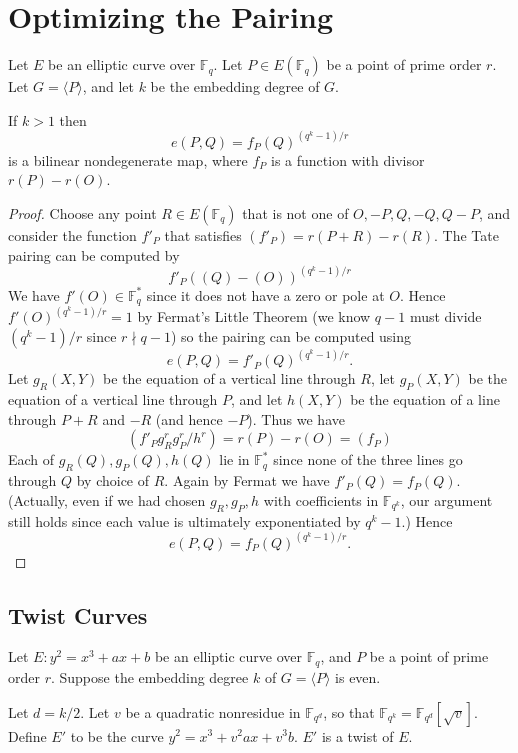\chapter{Optimizing the Pairing}

\begin{theorem}
Let $E$ be an elliptic curve over $\mathbb{F}_q$.
Let $P \in E(\mathbb{F}_q)$ be a point of prime order $r$.
Let $G = \langle P \rangle$, and let $k$ be the embedding degree of $G$.

If $k > 1$ then
\[
e(P,Q) = f_P(Q)^{(q^k-1)/r}
\]
is a bilinear nondegenerate map,
where $f_P$ is a function with divisor $r(P) - r(O)$.
\end{theorem}

\begin{proof}
Choose any point $R \in E(\mathbb{F}_q)$ that is not one of
$O, -P, Q, -Q, Q - P$,
and consider the function $f'_P$ that satisfies $(f'_P) = r(P+R) - r(R)$.
The Tate pairing can be computed by
\[
f'_P((Q)-(O))^{(q^k-1)/r}
\]
We have $f'(O) \in \mathbb{F}_q^*$ since it does not have a zero or pole
at $O$. Hence
$f'(O)^{(q^k-1)/r} = 1$ by Fermat's Little Theorem (we know $q-1$ must
divide $(q^k - 1)/r$ since $r\nmid q-1$) so the pairing can be computed using
\[ e(P,Q) = f'_P(Q)^{(q^k-1)/r} . \]
Let $g_R(X,Y)$ be the equation of a vertical line through $R$,
let $g_P(X,Y)$ be the equation of a vertical line through $P$,
and let $h(X,Y)$ be the equation of a line through $P+R$ and $-R$ (and hence
$-P$).
Thus we have
\[ (f'_P g_R^r g_P^r / h^r) = r (P) - r(O) = (f_P) \]
Each of $g_R(Q), g_P(Q), h(Q)$ lie in $\mathbb{F}_q^*$ since none
of the three lines go through $Q$ by choice of $R$.
Again by Fermat we have $f'_P(Q) = f_P(Q)$. (Actually, even if we
had chosen $g_R, g_P, h$ with coefficients in $\mathbb{F}_{q^k}$, our
argument still holds since each value is ultimately exponentiated by
$q^k-1$.)
Hence
\[e(P,Q) = f_P(Q)^{(q^k-1)/r} . \]
\end{proof}

\section {Twist Curves}

Let $E : y^2 = x^3 + a x + b$ be an elliptic curve over $\mathbb{F}_q$,
and $P$ be a point of prime order $r$.
Suppose the embedding degree $k$ of $G = \langle P \rangle$ is even.

Let $d = k / 2$. Let $v$ be a quadratic nonresidue in $\mathbb{F}_{q^d}$,
so that $\mathbb{F}_{q^k} = \mathbb{F}_{q^d}[\sqrt{v}]$.
Define $E'$ to be the curve $y^2 = x^3 + v^2 a x + v^3 b$. $E'$ is a twist
of $E$.

